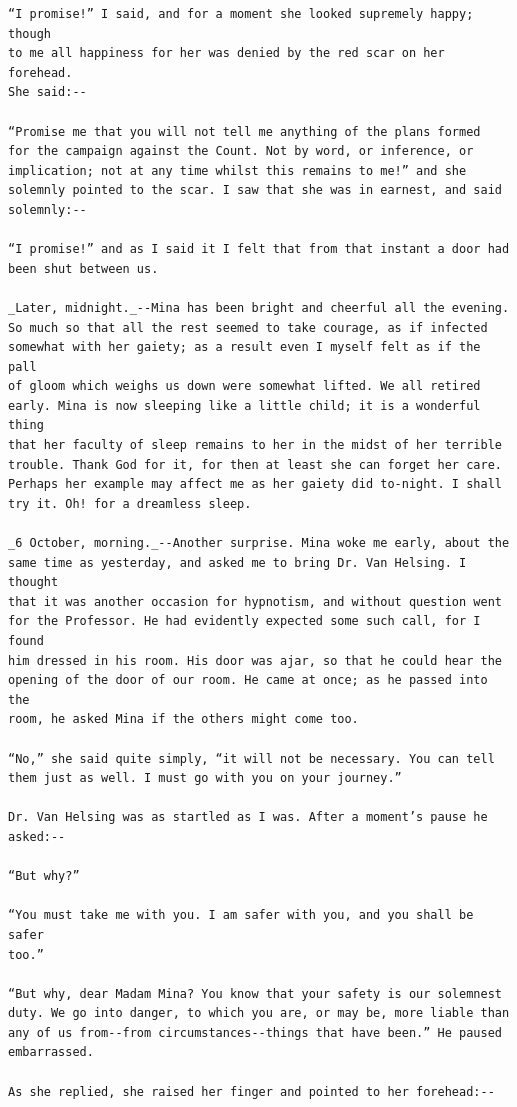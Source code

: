 \documentclass{article}
\begin{document}
\begin{verbatim}
“I promise!” I said, and for a moment she looked supremely happy; though
to me all happiness for her was denied by the red scar on her forehead.
She said:--

“Promise me that you will not tell me anything of the plans formed
for the campaign against the Count. Not by word, or inference, or
implication; not at any time whilst this remains to me!” and she
solemnly pointed to the scar. I saw that she was in earnest, and said
solemnly:--

“I promise!” and as I said it I felt that from that instant a door had
been shut between us.

_Later, midnight._--Mina has been bright and cheerful all the evening.
So much so that all the rest seemed to take courage, as if infected
somewhat with her gaiety; as a result even I myself felt as if the pall
of gloom which weighs us down were somewhat lifted. We all retired
early. Mina is now sleeping like a little child; it is a wonderful thing
that her faculty of sleep remains to her in the midst of her terrible
trouble. Thank God for it, for then at least she can forget her care.
Perhaps her example may affect me as her gaiety did to-night. I shall
try it. Oh! for a dreamless sleep.

_6 October, morning._--Another surprise. Mina woke me early, about the
same time as yesterday, and asked me to bring Dr. Van Helsing. I thought
that it was another occasion for hypnotism, and without question went
for the Professor. He had evidently expected some such call, for I found
him dressed in his room. His door was ajar, so that he could hear the
opening of the door of our room. He came at once; as he passed into the
room, he asked Mina if the others might come too.

“No,” she said quite simply, “it will not be necessary. You can tell
them just as well. I must go with you on your journey.”

Dr. Van Helsing was as startled as I was. After a moment’s pause he
asked:--

“But why?”

“You must take me with you. I am safer with you, and you shall be safer
too.”

“But why, dear Madam Mina? You know that your safety is our solemnest
duty. We go into danger, to which you are, or may be, more liable than
any of us from--from circumstances--things that have been.” He paused
embarrassed.

As she replied, she raised her finger and pointed to her forehead:--


\end{verbatim}
\end{document}
